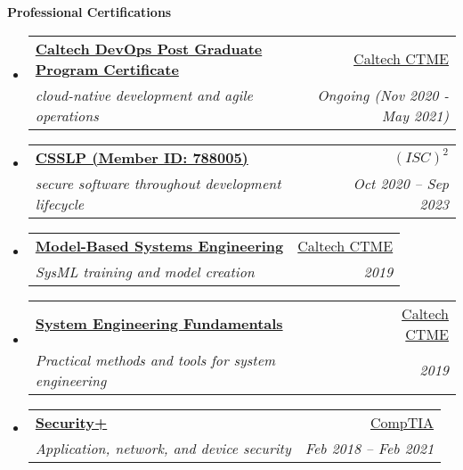 \documentclass[letterpaper,11pt]{article}
\makeatletter
\newcommand{\resheading}[1]{{\large \textbf{#1}}}
\newcommand{\ressubheading}[4]{
\begin{tabular*}{6.5in}{l@{\extracolsep{\fill}}r}
		\textbf{#1} & #2 \\
		\textit{#3} & \textit{#4} \\
\end{tabular*}\vspace{-6pt}}
\makeatother
\begin{document}
\resheading{Professional Certifications}
\begin{itemize}
    \item
       \ressubheading{\href{https://ctme.caltech.edu/programs-for-individuals/software-engineering-open/devops-pgp}{Caltech DevOps Post Graduate Program Certificate}
       }{\href{https://ctme.caltech.edu/}{Caltech CTME}
       }{cloud-native development and agile operations
       }{Ongoing (Nov 2020 - May 2021)}
    \item
        \ressubheading{\href{https://www.isc2.org/Certifications/CSSLP}{CSSLP (Member ID: 788005)}
        }{\href{https://www.isc2.org/}{$(ISC)^2$}
        }{secure software throughout development lifecycle
        }{Oct 2020 -- Sep 2023}
     \item
        \ressubheading{\href{https://ctme.caltech.edu/programs-for-individuals/advanced-engineering-open/model-based-systems-engineering-certificate-open}{Model-Based Systems Engineering}
        }{\href{https://ctme.caltech.edu/}{Caltech CTME}
        }{SysML training and model creation
        }{2019}
      \item
        \ressubheading{\href{https://ctme.caltech.edu/programs-for-individuals/advanced-engineering-open/systems-engineering-fundamentals-open}{System Engineering Fundamentals}
        }{\href{https://ctme.caltech.edu/}{Caltech CTME}
        }{Practical methods and tools for system engineering
        }{2019}
    \item
        \ressubheading{\href{https://certification.comptia.org/certifications/security}{Security+}
        }{\href{https://certification.comptia.org/home}{CompTIA}
        }{Application, network, and device security
        }{Feb 2018 -- Feb 2021}
\end{itemize}
~
\end{document}
